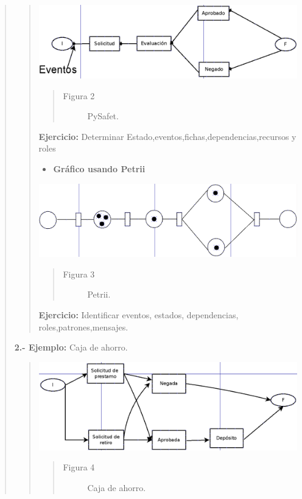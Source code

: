 \documentclass[letterpaper,11pt,spanish]{sphinxmanual}
\begin{document}
\begin{quote}
\begin{quote}
\begin{itemize}
\end{itemize}

\includegraphics{Diagrama_Pysafe.png}
\begin{quote}\begin{description}
\item[{Figura 2}] \leavevmode
PySafet.

\end{description}\end{quote}

\textbf{Ejercicio:} Determinar Estado,eventos,fichas,dependencias,recursos y roles
\begin{itemize}
\item {} 
\textbf{Gráfico usando Petrii}

\end{itemize}

\includegraphics{Diagrama_Petrii.png}
\begin{quote}\begin{description}
\item[{Figura 3}] \leavevmode
Petrii.

\end{description}\end{quote}

\textbf{Ejercicio:} Identificar eventos, estados, dependencias, roles,patrones,mensajes.
\end{quote}

\textbf{2.- Ejemplo:} Caja de ahorro.
\begin{quote}

\includegraphics{Caja_ahorro.png}
\begin{quote}\begin{description}
\item[{Figura 4}] \leavevmode
Caja de ahorro.


\end{description}
\end{quote}
\end{quote}
\end{quote}
\end{document}
